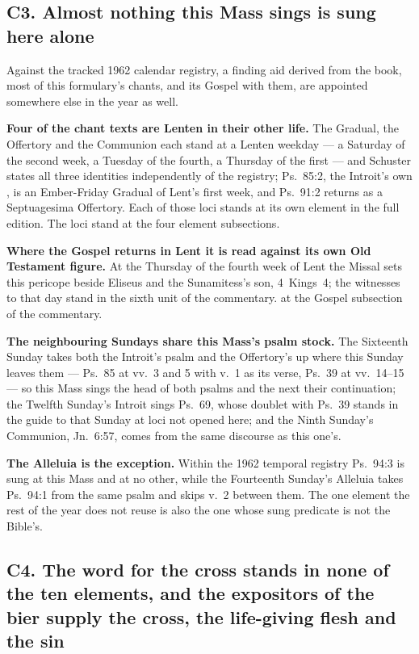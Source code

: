 \subsection*{C3. Almost nothing this Mass sings is sung here alone}

Against the tracked 1962 calendar registry, a finding aid derived from the book,
most of this formulary's chants, and its Gospel with them, are appointed somewhere else in the year as well.

\textbf{Four of the chant texts are Lenten in their other life.} The Gradual,
the Offertory and the Communion each stand at a Lenten weekday --- a Saturday of
the second week, a Tuesday of the fourth, a Thursday of the first --- and
Schuster states all three identities independently of the registry; Ps.~85:2,
the Introit's own , is an Ember-Friday Gradual of Lent's first
week, and Ps.~91:2 returns as a Septuagesima Offertory.
\ifdefined\TriptychSynthesisEdition
Each of those loci stands at its own element in the full edition.%
\else
The loci stand at the
four element subsections.%
\fi{}

\textbf{Where the Gospel returns in Lent it is read against its own Old Testament
figure.} At the Thursday of the fourth week of Lent the Missal sets this
pericope beside Eliseus and the Sunamitess's son, 4~Kings~4; the witnesses to
that day stand
\ifdefined\TriptychSynthesisEdition
in the sixth unit of the commentary.%
\else
at the Gospel subsection of the commentary.%
\fi{}

\textbf{The neighbouring Sundays share this Mass's psalm stock.} The Sixteenth
Sunday takes both the Introit's psalm and the Offertory's up where this Sunday
leaves them --- Ps.~85 at vv.~3 and 5 with v.~1 as its verse, Ps.~39 at
vv.~14--15 --- so this Mass sings the head of both psalms and the next their continuation; the
Twelfth Sunday's Introit sings Ps.~69, whose doublet with Ps.~39 stands in the
guide to that Sunday at loci not opened here; and the Ninth Sunday's Communion,
Jn.\ 6:57, comes from the same discourse as this one's.

\textbf{The Alleluia is the exception.} Within the 1962 temporal registry Ps.\
94:3 is sung at this Mass and at no other, while the Fourteenth Sunday's Alleluia
takes Ps.~94:1 from the same psalm and skips v.~2 between them. The one element
the rest of the year does not reuse is also the one whose sung predicate is not
the Bible's.

\subsection*{C4. The word for the cross stands in none of the ten elements, and the expositors of the bier supply the cross, the life-giving flesh and the sin}

